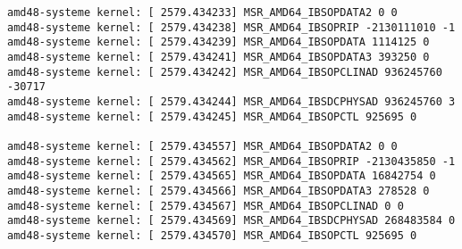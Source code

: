 \begin{verbatim}
amd48-systeme kernel: [ 2579.434233] MSR_AMD64_IBSOPDATA2 0 0
amd48-systeme kernel: [ 2579.434238] MSR_AMD64_IBSOPRIP -2130111010 -1
amd48-systeme kernel: [ 2579.434239] MSR_AMD64_IBSOPDATA 1114125 0
amd48-systeme kernel: [ 2579.434241] MSR_AMD64_IBSOPDATA3 393250 0
amd48-systeme kernel: [ 2579.434242] MSR_AMD64_IBSOPCLINAD 936245760 -30717
amd48-systeme kernel: [ 2579.434244] MSR_AMD64_IBSDCPHYSAD 936245760 3
amd48-systeme kernel: [ 2579.434245] MSR_AMD64_IBSOPCTL 925695 0

amd48-systeme kernel: [ 2579.434557] MSR_AMD64_IBSOPDATA2 0 0
amd48-systeme kernel: [ 2579.434562] MSR_AMD64_IBSOPRIP -2130435850 -1
amd48-systeme kernel: [ 2579.434565] MSR_AMD64_IBSOPDATA 16842754 0
amd48-systeme kernel: [ 2579.434566] MSR_AMD64_IBSOPDATA3 278528 0
amd48-systeme kernel: [ 2579.434567] MSR_AMD64_IBSOPCLINAD 0 0
amd48-systeme kernel: [ 2579.434569] MSR_AMD64_IBSDCPHYSAD 268483584 0
amd48-systeme kernel: [ 2579.434570] MSR_AMD64_IBSOPCTL 925695 0
		\end{verbatim}
